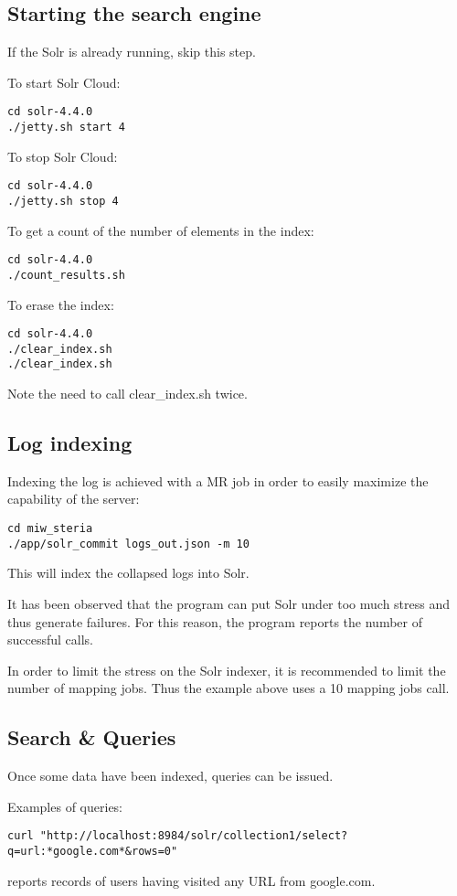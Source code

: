 \documentclass[twoside,11pt]{article}
\begin{document}
\subsection{Starting the search engine}
If the Solr is already running, skip this step.

To start Solr Cloud:
\begin{verbatim}
cd solr-4.4.0 
./jetty.sh start 4
\end{verbatim}

To stop Solr Cloud:
\begin{verbatim}
cd solr-4.4.0 
./jetty.sh stop 4
\end{verbatim}

To get a count of the number of elements in the index:
\begin{verbatim}
cd solr-4.4.0
./count_results.sh
\end{verbatim}

To erase the index:
\begin{verbatim}
cd solr-4.4.0
./clear_index.sh
./clear_index.sh
\end{verbatim}
Note the need to call clear\_index.sh twice.

\subsection{Log indexing}
Indexing the log is achieved with a MR job in order to easily maximize the capability of the server:
\begin{verbatim}
cd miw_steria
./app/solr_commit logs_out.json -m 10
\end{verbatim}
This will index the collapsed logs into Solr. 

It has been observed that the program can put Solr under too much stress and thus generate failures. For this reason, the program reports the number of successful calls.

In order to limit the stress on the Solr indexer, it is recommended to limit the number of mapping jobs. Thus the example above uses a 10 mapping jobs call.

\subsection{Search \& Queries}
Once some data have been indexed, queries can be issued.

Examples of queries:
\begin{verbatim}
curl "http://localhost:8984/solr/collection1/select?q=url:*google.com*&rows=0"
\end{verbatim}
reports records of users having visited any URL from google.com.
\end{document}
